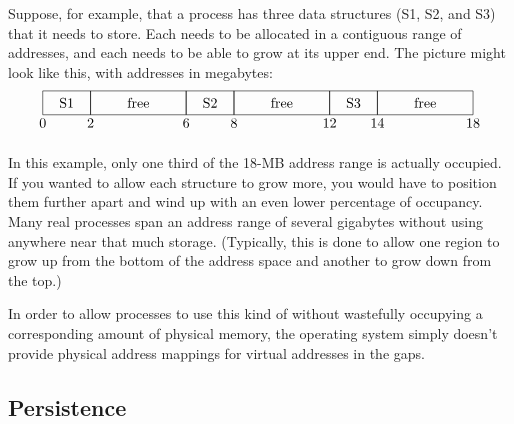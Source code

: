 Suppose, for example, that a process has three data structures (S1, S2, and
S3) that it needs to store.  Each needs to be allocated in a
contiguous range of addresses, and each needs to be able to grow at
its upper end.  The picture might look like this, with addresses in megabytes:
\[\begin{tikzpicture}[scale=.03]
\draw (0,0) rectangle (40,20);
\draw (40,0) rectangle (120,20);
\draw (120,0) rectangle (160,20);
\draw (160,0) rectangle (240,20);
\draw (240,0) rectangle (280,20);
\draw (280,0) rectangle (360,20);
\draw (20,10) node{S1};
\draw (80,10) node{free};
\draw (140,10) node{S2};
\draw (200,10) node{free};
\draw (260,10) node{S3};
\draw (320,10) node{free};
\draw (0,-7) node{0};
\draw (40,-7) node{2};
\draw (120,-7) node{6};
\draw (160,-7) node{8};
\draw (240,-7) node{12};
\draw (280,-7) node{14};
\draw (360,-7) node{18};
\end{tikzpicture}\]

In this example, only one third of the 18-MB address range is actually
occupied.  If you wanted to allow each structure to grow more, you would
have to position them further apart and wind up with an even lower
percentage of occupancy.  Many real processes span an address range of
several gigabytes without using anywhere near that much storage.
(Typically, this is done to allow one region to grow up from the
bottom of the address space and another to grow down from the top.)

In order to allow processes to use this kind of
 without wastefully occupying a
corresponding amount of physical memory, the operating system simply
doesn't provide physical address mappings for virtual addresses in the
gaps.

\subsection{Persistence}


